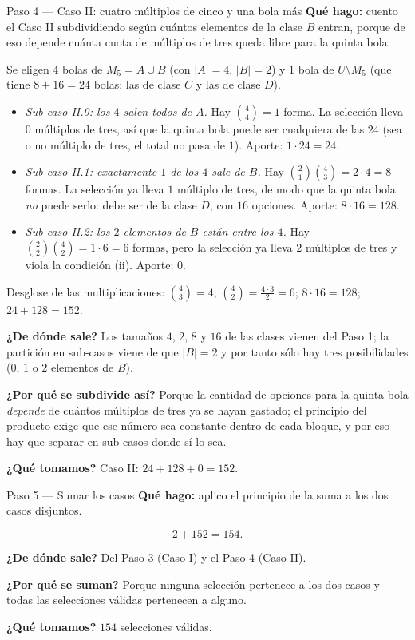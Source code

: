 \documentclass[11pt]{article}
\begin{document}
\begin{paso}{Paso 4 --- Caso II: cuatro múltiplos de cinco y una bola más}
\textbf{Qué hago:} cuento el Caso II subdividiendo según cuántos elementos de la clase $B$ entran, porque de eso depende cuánta cuota de múltiplos de tres queda libre para la quinta bola.

Se eligen $4$ bolas de $M_5=A\cup B$ (con $|A|=4$, $|B|=2$) y $1$ bola de $U\setminus M_5$ (que tiene $8+16=24$ bolas: las de clase $C$ y las de clase $D$).
\begin{itemize}[leftmargin=1.3em,itemsep=2pt]
\item \emph{Sub-caso II.0: los $4$ salen todos de $A$.} Hay $\binom{4}{4}=1$ forma. La selección lleva $0$ múltiplos de tres, así que la quinta bola puede ser cualquiera de las $24$ (sea o no múltiplo de tres, el total no pasa de $1$). Aporte: $1\cdot 24 = 24$.
\item \emph{Sub-caso II.1: exactamente $1$ de los $4$ sale de $B$.} Hay $\binom{2}{1}\binom{4}{3}=2\cdot 4 = 8$ formas. La selección ya lleva $1$ múltiplo de tres, de modo que la quinta bola \emph{no} puede serlo: debe ser de la clase $D$, con $16$ opciones. Aporte: $8\cdot 16 = 128$.
\item \emph{Sub-caso II.2: los $2$ elementos de $B$ están entre los $4$.} Hay $\binom{2}{2}\binom{4}{2}=1\cdot 6 = 6$ formas, pero la selección ya lleva $2$ múltiplos de tres y viola la condición (ii). Aporte: $0$.
\end{itemize}
Desglose de las multiplicaciones: $\binom{4}{3}=4$; $\binom{4}{2}=\frac{4\cdot 3}{2}=6$; $8\cdot 16 = 128$; $24+128 = 152$.

\textbf{¿De dónde sale?} Los tamaños $4$, $2$, $8$ y $16$ de las clases vienen del Paso 1; la partición en sub-casos viene de que $|B|=2$ y por tanto sólo hay tres posibilidades ($0$, $1$ o $2$ elementos de $B$).

\textbf{¿Por qué se subdivide así?} Porque la cantidad de opciones para la quinta bola \emph{depende} de cuántos múltiplos de tres ya se hayan gastado; el principio del producto exige que ese número sea constante dentro de cada bloque, y por eso hay que separar en sub-casos donde sí lo sea.

\textbf{¿Qué tomamos?} Caso II: $24+128+0 = 152$.
\end{paso}

\begin{paso}{Paso 5 --- Sumar los casos}
\textbf{Qué hago:} aplico el principio de la suma a los dos casos disjuntos.

\[
2 + 152 = 154 .
\]

\textbf{¿De dónde sale?} Del Paso 3 (Caso I) y el Paso 4 (Caso II).

\textbf{¿Por qué se suman?} Porque ninguna selección pertenece a los dos casos y todas las selecciones válidas pertenecen a alguno.

\textbf{¿Qué tomamos?} $154$ selecciones válidas.
\end{paso}
\end{document}
